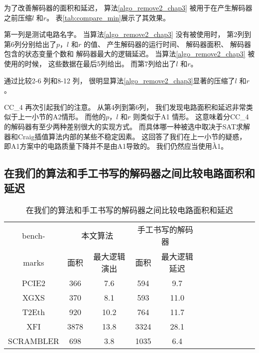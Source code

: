为了改善解码器的面积和延迟，
算法\ref{algo_remove2_chap3} 被用于在产生解码器之前压缩$l$ 和$r$。
表\ref{tab:compare_min}展示了其效果。

第一列是测试电路名字。
当算法\ref{algo_remove2_chap3} 没有被使用时，
第2列到第6列分别给出了$p$，$l$ 和$r$ 的值、
产生解码器的运行时间、
解码器面积、
解码器包含的状态变量个数和
解码器最大的逻辑延迟。
当算法\ref{algo_remove2_chap3} 被使用的时候，
这些数据在最后5列给出。
而第7列给出了$l$ 和$r$。

通过比较2-6 列和8-12 列，
很明显算法\ref{algo_remove2_chap3}显著的压缩了$l$ 和$r$ 。

CC\_4 再次引起我们的注意。
从第4列到第6列，
我们发现电路面积和延迟非常类似于上一小节的A2情形。
而他的$p$，$l$ 和$r$ 则类似于A1 情形。
这意味着分CC\_4 的解码器有至少两种差别很大的实现方式。
而具体哪一种被选中取决于SAT求解器和Craig插值算法内部的某些不稳定因素。
这回答了我们在上一小节的疑惑，
即A1方案中的电路质量下降并不是由A1导致的。
我们仍然应当使用À1。


\subsection{在我们的算法和手工书写的解码器之间比较电路面积和延迟}\label{subsec_compareman}

\begin{table}[b]%
\caption{在我们的算法和手工书写的解码器之间比较电路面积和延迟}
\label{tab:comparing_hand}
\centering
\begin{tabular}{|c|c|c|c|c|c|c|c|c|c|c|c|}
\hline
bench-   & \multicolumn{2}{|c|}{本文算法} &  \multicolumn{2}{|c|}{手工书写的解码器} \\\cline{2-5}
marks    & 面积    & 最大逻辑演出       &面积    & 最大逻辑延迟\\\hline
PCIE2    & 366     &7.6                 & 594    & 9.7                              \\\hline
XGXS     & 370     &8.1                 & 593    & 11.0                             \\\hline
T2Eth    & 920     &10.2                & 764    & 11.7                             \\\hline
XFI      & 3878    & 13.8               & 3324   & 28.1                             \\\hline
SCRAMBLER& 698     & 3.8                & 1035   & 6.4                              \\\hline
\end{tabular}
\end{table}%

